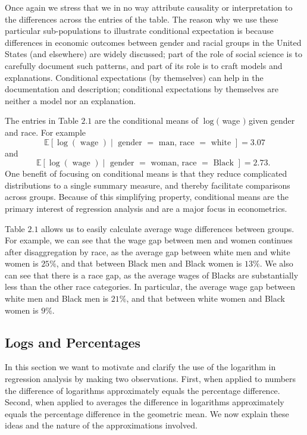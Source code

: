 \documentclass[10pt]{article}
\begin{document}
Once again we stress that we in no way attribute causality or interpretation to the differences across the entries of the table. The reason why we use these particular sub-populations to illustrate conditional expectation is because differences in economic outcomes between gender and racial groups in the United States (and elsewhere) are widely discussed; part of the role of social science is to carefully document such patterns, and part of its role is to craft models and explanations. Conditional expectations (by themselves) can help in the documentation and description; conditional expectations by themselves are neither a model nor an explanation.

The entries in Table $2.1$ are the conditional means of $\log ($ wage $)$ given gender and race. For example
$$
\mathbb{E}[\log (\text { wage }) \mid \text { gender }=\text { man, race }=\text { white }]=3.07
$$
and
$$
\mathbb{E}[\log (\text { wage }) \mid \text { gender }=\text { woman, race }=\text { Black }]=2.73 \text {. }
$$
One benefit of focusing on conditional means is that they reduce complicated distributions to a single summary measure, and thereby facilitate comparisons across groups. Because of this simplifying property, conditional means are the primary interest of regression analysis and are a major focus in econometrics.

Table $2.1$ allows us to easily calculate average wage differences between groups. For example, we can see that the wage gap between men and women continues after disaggregation by race, as the average gap between white men and white women is $25 \%$, and that between Black men and Black women is $13 \%$. We also can see that there is a race gap, as the average wages of Blacks are substantially less than the other race categories. In particular, the average wage gap between white men and Black men is $21 \%$, and that between white women and Black women is $9 \%$.

\subsection{Logs and Percentages}
In this section we want to motivate and clarify the use of the logarithm in regression analysis by making two observations. First, when applied to numbers the difference of logarithms approximately equals the percentage difference. Second, when applied to averages the difference in logarithms approximately equals the percentage difference in the geometric mean. We now explain these ideas and the nature of the approximations involved.
\end{document}
